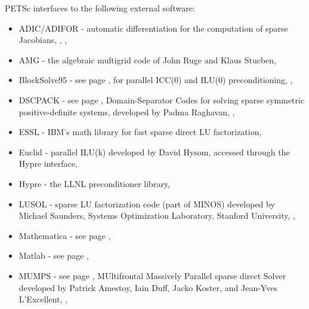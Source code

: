 \vspace{.3in}
\noindent
PETSc interfaces to the following external software:
\begin{itemize}
  \item ADIC/ADIFOR -  automatic differentiation for the computation of sparse Jacobians, 
                     ,
                     ,
  \item AMG -         the algebraic multigrid code of John Ruge and Klaus Stueben,
  \item BlockSolve95 - see page \pageref{sec_blocksolve}, for parallel ICC(0) and ILU(0) preconditioning,
                     ,
  \item DSCPACK -    see page \pageref{sec_externalsol}, Domain-Separator Codes for solving sparse symmetric
                      positive-definite systems, 
                     developed by Padma Raghavan,   
                     ,
  \item ESSL -         IBM's math library for fast sparse direct LU factorization,
  \item Euclid  -   parallel ILU(k) developed by David Hysom, accessed through the Hypre interface,
  \item Hypre -    the LLNL preconditioner library, 
  \item LUSOL -       sparse LU factorization code (part of MINOS) developed by Michael Saunders,
                      Systems Optimization Laboratory, Stanford University,
                     ,
  \item Mathematica -  see page \pageref{ch_mathematica},
  \item Matlab -      see page \pageref{ch_matlab},
  \item MUMPS -      see page \pageref{sec_externalsol}, MUltifrontal Massively Parallel sparse direct Solver developed by Patrick Amestoy, 
                     Iain Duff, Jacko Koster, and Jean-Yves L'Excellent,
                     ,

\end{itemize}
